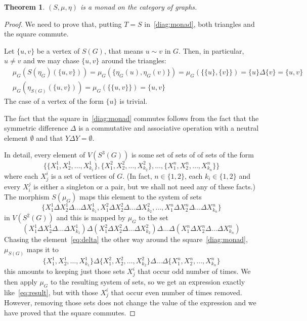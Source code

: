 \documentclass[reqno,A4paper]{amsart}
\newtheorem{theorem}{Theorem}[section]
\theoremstyle{definition}
\numberwithin{equation}{section}
\begin{document}
\begin{theorem}
$(S,\mu,\eta)$ is a monad on the category of graphs.
\end{theorem}
\begin{proof}
We need to prove that, putting $T=S$ in~\eqref{diag:monad},  both triangles and the square 
commute.

Let $\{u,v\}$ be a vertex of $S(G)$, that means $u\sim v$ in $G$.
Then, in particular, $u\neq v$ and we may chase $\{u,v\}$ around the triangles:
\begin{align*}
&\mu_G(S(\eta_G)(\{u,v\}))=\mu_G(\{\eta_G(u),\eta_G(v)\})=\mu_G(\{\{u\},\{v\}\})=
\{u\}\Delta\{v\}=\{u,v\}\\
&\mu_G(\eta_{S(G)}(\{u,v\}))=\mu_G(\{\{u,v\}\})=\{u,v\}
\end{align*}
The case of a vertex of the form $\{u\}$ is trivial.

The fact that the square in~\eqref{diag:monad} commutes follows from the fact that
the symmetric difference $\Delta$ is a commutative and associative operation 
with a neutral element $\emptyset$ and that $Y\Delta Y=\emptyset$.

In detail, every element of $V(S^3(G))$ is some set of sets of of sets of the form
\begin{equation}
\label{eq:delta}
\{\{X^1_1,X^1_2,\dots,X^1_{k_1}\},\{X^2_1,X^2_2,\dots,X^2_{k_2}\},\dots,\{X^n_1,X^n_2,\dots,X^n_{k_n}\}\}
\end{equation}
where each $X^i_j$ is a set of vertices of $G$. (In fact, $n\in\{1,2\}$,
each $k_i\in\{1,2\}$ and every $X_i^j$ is either a singleton or a pair, but we shall not need any of these facts.)
The morphism $S(\mu_G)$ maps this
element to the system of sets
$$
\{X^1_1\Delta X^1_2\Delta \dots\Delta X^1_{k_1},X^2_1\Delta X^2_2\Delta \dots\Delta X^2_{k_2},\dots,X^n_1\Delta X^n_2\Delta \dots\Delta X^n_{k_n}\}
$$
in $V(S^2(G))$ and this is mapped by $\mu_G$ to the set
\begin{equation}\label{eq:result}
(X^1_1\Delta X^1_2\Delta \dots\Delta X^1_{k_1})\Delta(X^2_1\Delta X^2_2\Delta \dots\Delta X^2_{k_2})\Delta\dots\Delta(X^n_1\Delta X^n_2\Delta \dots\Delta X^n_{k_n})
\end{equation}
Chasing the element~\eqref{eq:delta} the other way around the square~\eqref{diag:monad}, 
$\mu_{S(G)}$ maps it to
$$
\{X^1_1,X^1_2,\dots,X^1_{k_1}\}\Delta \{X^2_1,X^2_2,\dots,X^2_{k_2}\}\Delta\dots\Delta\{X^n_1,X^n_2,\dots,X^n_{k_n}\}
$$
this amounts to keeping just those sets $X^i_j$ that occur odd number of times. We then apply $\mu_G$ to the
resulting system of sets, so we get an expression exactly like~\eqref{eq:result}, but with
those $X^i_j$ that occur even number of times removed. However, removing those
sets does not change the value of the expression and we have proved that the square commutes.
\end{proof}
\end{document}
